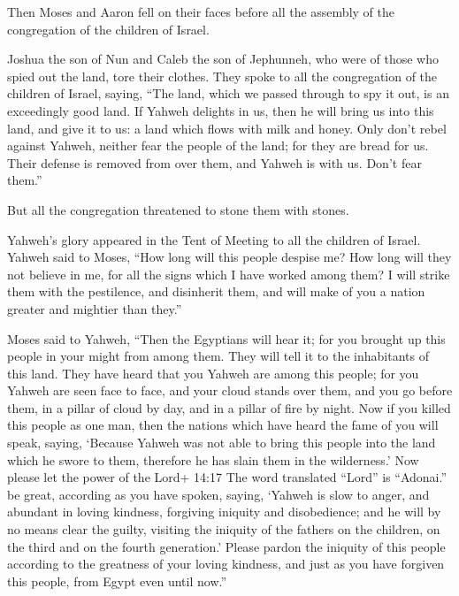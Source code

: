  Then Moses and Aaron fell on their faces before all the
assembly of the congregation of the children of Israel.

 Joshua the son of Nun and Caleb the son of Jephunneh, who
were of those who spied out the land, tore their clothes. 
They spoke to all the congregation of the children of Israel, saying,
``The land, which we passed through to spy it out, is an exceedingly
good land.  If Yahweh delights in us, then he will bring us
into this land, and give it to us: a land which flows with milk and
honey.  Only don't rebel against Yahweh, neither fear the
people of the land; for they are bread for us. Their defense is removed
from over them, and Yahweh is with us. Don't fear them.''

 But all the congregation threatened to stone them with
stones.

Yahweh's glory appeared in the Tent of Meeting to all the children of
Israel.  Yahweh said to Moses, ``How long will this people
despise me? How long will they not believe in me, for all the signs
which I have worked among them?  I will strike them with
the pestilence, and disinherit them, and will make of you a nation
greater and mightier than they.''

 Moses said to Yahweh, ``Then the Egyptians will hear it;
for you brought up this people in your might from among them.
 They will tell it to the inhabitants of this land. They
have heard that you Yahweh are among this people; for you Yahweh are
seen face to face, and your cloud stands over them, and you go before
them, in a pillar of cloud by day, and in a pillar of fire by night.
 Now if you killed this people as one man, then the nations
which have heard the fame of you will speak, saying, 
`Because Yahweh was not able to bring this people into the land which he
swore to them, therefore he has slain them in the wilderness.'
 Now please let the power of the Lord+ 14:17 The word
translated ``Lord'' is ``Adonai.'' be great, according as you have
spoken, saying,  `Yahweh is slow to anger, and abundant in
loving kindness, forgiving iniquity and disobedience; and he will by no
means clear the guilty, visiting the iniquity of the fathers on the
children, on the third and on the fourth generation.' 
Please pardon the iniquity of this people according to the greatness of
your loving kindness, and just as you have forgiven this people, from
Egypt even until now.''

